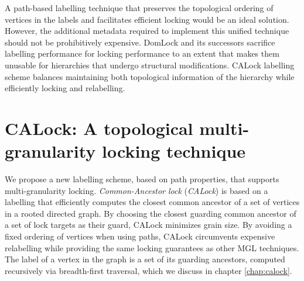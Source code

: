 A path-based labelling technique that preserves the topological ordering of vertices in the labels and facilitates efficient locking would be an ideal solution. However, the additional metadata required to implement this unified technique should not be prohibitively expensive. DomLock and its successors sacrifice labelling performance for locking performance to an extent that makes them unusable for hierarchies that undergo structural modifications. CALock labelling scheme balances maintaining both topological information of the hierarchy while efficiently locking and relabelling. 

\section{CALock: A topological multi-granularity locking technique}

We propose a new labelling scheme, based on path properties, that supports multi-granularity locking. {\em Common-Ancestor lock} ({\em CALock}) is based on a labelling that efficiently computes the closest common ancestor of a set of vertices in a rooted directed graph.
By choosing the closest guarding common ancestor of a set of lock targets as their guard, CALock minimizes grain size. By avoiding a fixed ordering of vertices when using paths, CALock circumvents expensive relabelling while providing the same locking guarantees as other MGL techniques. The label of a vertex in the graph is a set of its guarding ancestors, computed recursively via breadth-first traversal, which we discuss in chapter \ref{chap:calock}.